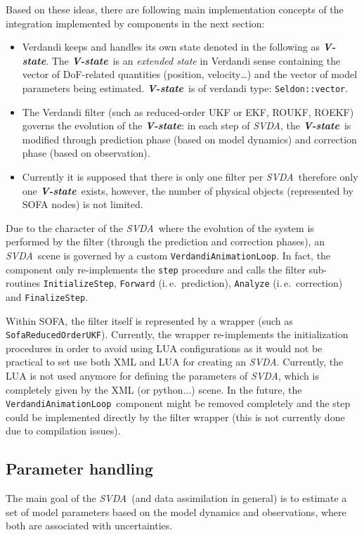 \documentclass[10pt]{article}
\def\ie{i.\,e.}
\def\vstate{\textit{\textbf{V-state}}}
\def\svda{\textit{SVDA}}
\def\veal{\texttt{VerdandiAnimationLoop}}
\def\sroukf{\texttt{SofaReducedOrderUKF}}
\begin{document}
Based on these ideas, there are following main implementation concepts of the integration implemented by components in the next section:
\begin{itemize}
\item Verdandi keeps and handles its own state denoted in the following as \vstate. The \vstate\ is an \emph{extended state} in Verdandi sense
containing the vector of DoF-related quantities (position, velocity\ldots) and the vector of model parameters being estimated. \vstate\ is of verdandi
type: \texttt{Seldon::vector}.
\item The Verdandi filter (such as reduced-order UKF or EKF, ROUKF, ROEKF) governs the evolution of the \vstate: in each step of \svda, the \vstate\
is modified through prediction phase (based on model dynamics) and correction phase (based on observation).
\item Currently it is supposed that there is only one filter per \svda\, therefore only one \vstate\ exists, however, the number of physical objects
(represented by SOFA nodes) is not limited. 
\end{itemize}
Due to the character of the \svda\ where the evolution of the system is performed by the filter (through the prediction and correction phases), an
\svda\ scene is governed by a custom \veal. In fact, the component only re-implements the \texttt{step} procedure and calls the filter sub-routines
\texttt{InitializeStep}, \texttt{Forward} (\ie\ prediction), \texttt{Analyze} (\ie\ correction) and \texttt{FinalizeStep}. 

Within SOFA, the filter itself is represented by a wrapper (such as \sroukf). Currently, the wrapper re-implements the initialization procedures in
order to avoid using LUA configurations as it would not be practical to set use both XML and LUA for creating an \svda. Currently, the LUA is not used
anymore for defining the parameters of \svda, which is completely given by the XML (or python...) scene.
In the future, the \veal\ component might be removed completely and the step could be implemented directly by the filter wrapper (this is not
currently done due to compilation issues).


\subsection{Parameter handling}
The main goal of the \svda\ (and data assimilation in general) is to estimate a set of model parameters based on the model dynamics and observations,
where both are associated with uncertainties.
\end{document}
